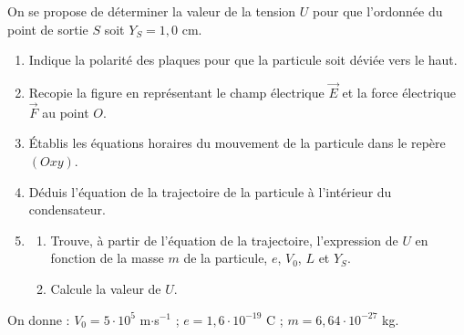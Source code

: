 \documentclass[11pt]{article}
\begin{document}
\noindent On se propose de déterminer la valeur de la tension $U$ pour que l'ordonnée du point de sortie $S$ soit $Y_S = 1{,}0$ cm.

\begin{enumerate}
  \item Indique la polarité des plaques pour que la particule soit déviée vers le haut.
  \item Recopie la figure en représentant le champ électrique $\vec{E}$ et la force électrique $\vec{F}$ au point $O$.
  \item Établis les équations horaires du mouvement de la particule dans le repère $(Oxy)$.
  \item Déduis l'équation de la trajectoire de la particule à l'intérieur du condensateur.
  \item \begin{enumerate}[label=\alph*.]
    \item Trouve, à partir de l'équation de la trajectoire, l'expression de $U$ en fonction de la masse $m$ de la particule, $e$, $V_0$, $L$ et $Y_S$.
    \item Calcule la valeur de $U$.
  \end{enumerate}
\end{enumerate}
\noindent On donne : $V_0 = 5\cdot10^5$ m$\cdot$s$^{-1}$ ; $e = 1{,}6\cdot10^{-19}$ C ; $m = 6{,}64\cdot10^{-27}$ kg.
\end{document}
